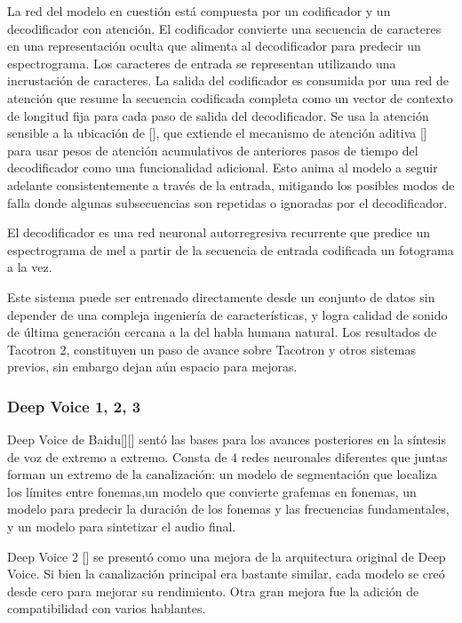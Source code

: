 La red del modelo en cuestión está compuesta por un codificador y un decodificador con atención. El codificador convierte una secuencia de caracteres en una representación oculta que alimenta al decodificador para predecir un espectrograma. Los caracteres de entrada se representan utilizando una incrustación de caracteres. La salida del codificador es consumida por una red de atención que resume la secuencia codificada completa como un vector de contexto de longitud fija para cada paso de salida del decodificador. Se usa la atención sensible a la ubicación de [\cite{chorowski2015attention}], que extiende el mecanismo de atención aditiva [\cite{bahdanau2014neural}] para usar pesos de atención acumulativos de anteriores pasos de tiempo del decodificador como una funcionalidad adicional. Esto anima al modelo a seguir adelante consistentemente a través de la entrada, mitigando los posibles modos de falla donde algunas subsecuencias son repetidas o ignoradas por el decodificador.

El decodificador es una red neuronal autorregresiva recurrente que predice un espectrograma de mel a partir de la secuencia de entrada codificada un fotograma a la vez. 

Este sistema puede ser entrenado directamente desde un conjunto de datos sin depender de una compleja ingeniería de características, y logra calidad de sonido de última generación cercana a la del habla humana natural. Los resultados de Tacotron 2, constituyen un paso de avance sobre Tacotron y otros sistemas previos, sin embargo dejan aún espacio para mejoras. 


\subsubsection{Deep Voice 1, 2, 3}
Deep Voice de Baidu[\cite{deep-voice}][\cite{arik2018neural}] sentó las bases para los avances posteriores en la síntesis de voz de extremo a extremo. Consta de 4 redes neuronales diferentes que juntas forman un extremo de la canalización: un modelo de segmentación que localiza los límites entre fonemas,un modelo que convierte grafemas en fonemas, un modelo para predecir la duración de los fonemas y las frecuencias fundamentales, y un modelo para sintetizar el audio final.

Deep Voice 2 [\cite{arik2018neural}]  se presentó como una mejora de la arquitectura original de Deep Voice. Si bien la canalización principal era bastante similar, cada modelo se creó desde cero para mejorar su rendimiento. Otra gran mejora fue la adición de compatibilidad con varios hablantes.

